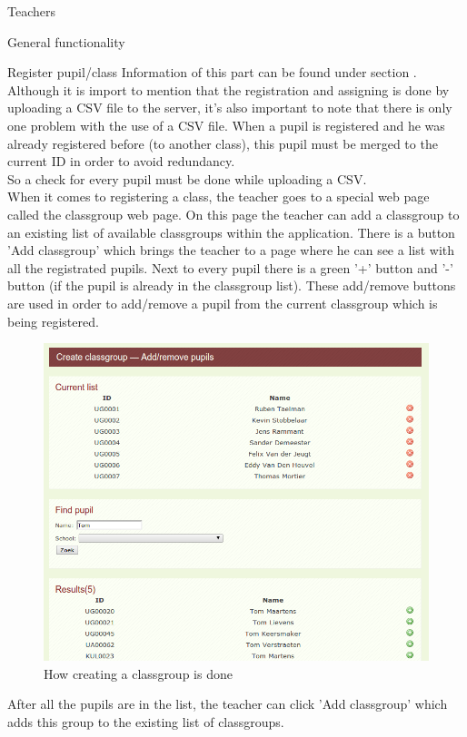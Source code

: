 \begin{section}{Teachers}
\begin{subsection}{General functionality}
        \begin{subsubsection}{Register pupil/class}
            Information of this part can be found under section .\\
            Although it is import to mention that the registration and assigning is done by uploading a CSV file to the server, it's also important to note that there is only one problem with the use of a CSV file. When a pupil is registered and he was already registered before (to another class), this pupil must be merged to the current ID in order to avoid
            redundancy.\\
            So a check for every pupil must be done while uploading a CSV. \\
            When it comes to registering a class, the teacher goes to a special web page called the classgroup web page. On this page
            the teacher can add a classgroup to an existing list of available classgroups within the application. There is a button
            'Add classgroup' which brings the teacher to a page where he can see a list with all the registrated pupils. Next to every
            pupil there is a green '+' button and '-' button (if the pupil is already in the classgroup list). These add/remove buttons
            are used in order to add/remove a pupil from the current classgroup which is being registered.\\
            \begin{figure}[!h]
                \centering
                \includegraphics[width=1\textwidth]{formal/img/add_remove_pupil_classgroup.png}
                \caption{How creating a classgroup is done}
                \label{create_classgroup}
            \end{figure}
            After all the pupils are in the list, the teacher can click 'Add classgroup' which adds this group to the existing list
            of classgroups. 
        \end{subsubsection}
				

\end{subsection}
\end{section}
